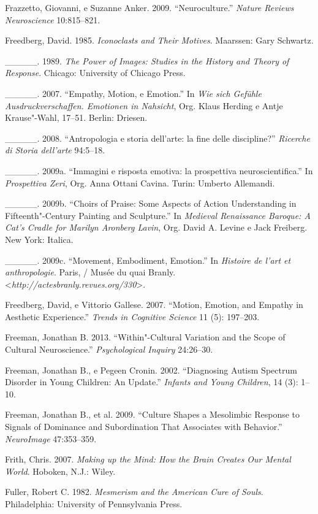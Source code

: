 {\begin{Parskip}
Frazzetto, Giovanni, e Suzanne Anker. 2009. ``Neuroculture.''
\emph{Nature Reviews Neuroscience} 10:815--821.

Freedberg, David. 1985. \emph{Iconoclasts and Their Motives}. Maarssen:
Gary Schwartz.

\_\_\_\_\_. 1989. \emph{The Power of Images: Studies in the History and
Theory of Response}. Chicago: University of Chicago Press.

\_\_\_\_\_. 2007. ``Empathy, Motion, e Emotion.'' In \emph{Wie sich
Gefühle Ausdruckverschaffen. Emotionen in Nahsicht}, Org. Klaus Herding
e Antje Krause"-Wahl, 17--51. Berlin: Driesen.

\_\_\_\_\_. 2008. ``Antropologia e storia dell'arte: la fine delle
discipline?'' \emph{Ricerche di Storia dell'arte} 94:5--18.

\_\_\_\_\_. 2009a. ``Immagini e risposta emotiva: la prospettiva
neuroscientifica.'' In \emph{Prospettiva Zeri}, Org. Anna Ottani Cavina.
Turin: Umberto Allemandi.

\_\_\_\_\_. 2009b. ``Choirs of Praise: Some Aspects of Action
Understanding in Fifteenth"-Century Painting and Sculpture.'' In
\emph{Medieval Renaissance Baroque: A Cat's Cradle for Marilyn Aronberg
Lavin}, Org. David A. Levine e Jack Freiberg. New York: Italica.

\_\_\_\_\_. 2009c. ``Movement, Embodiment, Emotion.'' In \emph{Histoire
de l'art et anthropologie}. Paris,  / Musée du quai Branly.
\textless{}\emph{http://actesbranly.revues.org/330}\textgreater{}.

Freedberg, David, e Vittorio Gallese. 2007. ``Motion, Emotion, and
Empathy in Aesthetic Experience.'' \emph{Trends in Cognitive Science} 11
(5): 197--203.

Freeman, Jonathan B. 2013. ``Within"-Cultural Variation and the Scope of
Cultural Neuroscience.'' \emph{Psychological Inquiry} 24:26--30.

Freeman, Jonathan B., e Pegeen Cronin. 2002. ``Diagnosing Autism
Spectrum Disorder in Young Children: An Update.'' \emph{Infants and
Young Children}, 14 (3): 1--10.

Freeman, Jonathan B., et al. 2009. ``Culture Shapes a Mesolimbic
Response to Signals of Dominance and Subordination That Associates with
Behavior.'' \emph{NeuroImage} 47:353--359.

Frith, Chris. 2007. \emph{Making up the Mind: How the Brain Creates Our
Mental World}. Hoboken, N.J.: Wiley.

Fuller, Robert C. 1982. \emph{Mesmerism and the American Cure of Souls}.
Philadelphia: University of Pennsylvania Press.


\end{Parskip}}
